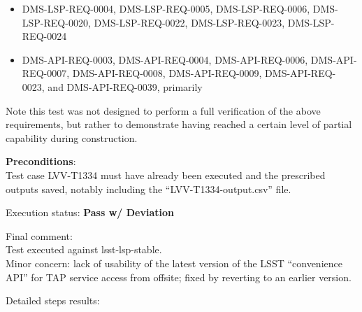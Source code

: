 \documentclass[DM,lsstdraft,STR,toc]{lsstdoc}
\providecommand{\tightlist}{
  \setlength{\itemsep}{0pt}\setlength{\parskip}{0pt}}
\begin{document}
\begin{itemize}
\tightlist
\item
  DMS-LSP-REQ-0004, DMS-LSP-REQ-0005, DMS-LSP-REQ-0006,
  DMS-LSP-REQ-0020, DMS-LSP-REQ-0022, DMS-LSP-REQ-0023, DMS-LSP-REQ-0024
\item
  DMS-API-REQ-0003, DMS-API-REQ-0004, DMS-API-REQ-0006,
  DMS-API-REQ-0007, DMS-API-REQ-0008, DMS-API-REQ-0009,
  DMS-API-REQ-0023, and DMS-API-REQ-0039, primarily
\end{itemize}

Note this test was not designed to perform a full verification of the
above requirements, but rather to demonstrate having reached a certain
level of partial capability during construction.


\textbf{ Preconditions}:\\
Test case LVV-T1334 must have already been executed and the prescribed
outputs saved, notably including the ``LVV-T1334-output.csv'' file.


Execution status: {\bf Pass w/ Deviation }

Final comment:\\Test executed against lsst-lsp-stable.\\
Minor concern: lack of usability of the latest version of the LSST
``convenience API'' for TAP service access from offsite; fixed by
reverting to an earlier version.



Detailed steps results:
\end{document}
